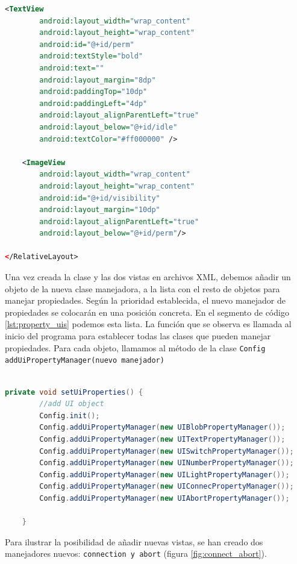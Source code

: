 \begin{lstlisting}[language=XML,caption={Vista XML en android},label={lst:xml_view}]
    <TextView
        android:layout_width="wrap_content"
        android:layout_height="wrap_content"
        android:id="@+id/perm"
        android:textStyle="bold"
        android:text=""
        android:layout_margin="8dp"
        android:paddingTop="10dp"
        android:paddingLeft="4dp"
        android:layout_alignParentLeft="true"
        android:layout_below="@+id/idle"
        android:textColor="#ff000000" />

    <ImageView
        android:layout_width="wrap_content"
        android:layout_height="wrap_content"
        android:id="@+id/visibility"
        android:layout_margin="10dp"
        android:layout_alignParentLeft="true"
        android:layout_below="@+id/perm"/>

</RelativeLayout>


\end{lstlisting}


\bigskip
Una vez creada la clase y las dos vistas en archivos XML, debemos añadir un objeto de la nueva clase manejadora, a la lista con el resto de objetos para manejar propiedades. Según la prioridad establecida, el nuevo manejador de propiedades se colocarán en una posición concreta. En el segmento de código \ref{lst:property_uis} podemos esta lista. La función que se observa es llamada al inicio del programa para establecer todas las clases que pueden manejar propiedades. Para cada objeto, llamamos al método de la clase \texttt{Config} \texttt{addUiPropertyManager(nuevo manejador)}

\begin{lstlisting}[language=Java,caption={Lista de objetos manejadores de propiedades},label={lst:property_uis}]

private void setUiProperties() {
        //add UI object
        Config.init();
        Config.addUiPropertyManager(new UIBlobPropertyManager());
        Config.addUiPropertyManager(new UITextPropertyManager());
        Config.addUiPropertyManager(new UISwitchPropertyManager());
        Config.addUiPropertyManager(new UINumberPropertyManager());
        Config.addUiPropertyManager(new UILightPropertyManager());
        Config.addUiPropertyManager(new UIConnecPropertyManager());
        Config.addUiPropertyManager(new UIAbortPropertyManager());

    }

\end{lstlisting}

\bigskip
Para ilustrar la posibilidad de añadir nuevas vistas, se han creado dos manejadores nuevos: \texttt{connection y abort} (figura \ref{fig:connect_abort}).

